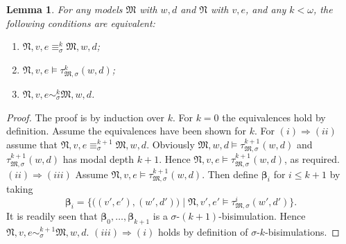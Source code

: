 \documentclass[10pt,a4paper]{amsart}
\theoremstyle{plain}
\newtheorem{lem}[thm]{Lemma}
\theoremstyle{definition}
\newcommand{\bs}{\boldsymbol{\beta}}
\begin{document}
\begin{lem}\label{lem:new3}
	For any models $\mathfrak{M}$ with $w,d$ and $\mathfrak{N}$ with $v,e$, and any $k < \omega$,  the following conditions are equivalent\textup{:} 
	\begin{enumerate}[style=multiline,leftmargin=0.8cm]
		\item[$(i)$] $\mathfrak{N},v,e \equiv_{\sigma}^{k} \mathfrak{M},w,d$\textup{;}
		\item[$(ii)$] $\mathfrak{N},v,e \models \tau_{\mathfrak{M},\sigma}^{k}(w,d)$\textup{;}
		\item[$(iii)$] $\mathfrak{N},v,e \sim_{\sigma}^{k} \mathfrak{M},w,d$.
	\end{enumerate}
\end{lem} 
%
\begin{proof}
	The proof is by induction over $k$. For $k=0$ the equivalences hold by definition. Assume the equivalences have been shown for $k$. For $(i) \Rightarrow (ii)$ assume that $\mathfrak{N},v,e \equiv_{\sigma}^{k+1} \mathfrak{M},w,d$. Obviously $\mathfrak{M},w,d \models \tau_{\mathfrak{M},\sigma}^{k+1}(w,d)$ and $\tau_{\mathfrak{M},\sigma}^{k+1}(w,d)$ has modal depth $k+1$. Hence
	$\mathfrak{N},v,e \models \tau_{\mathfrak{M},\sigma}^{k+1}(w,d)$, as required.
	$(ii) \Rightarrow (iii)$
	Assume $\mathfrak{N},v,e\models \tau_{\mathfrak{M},\sigma}^{k+1}(w,d)$. Then define $\bs_i$ for $i\leq k+1$ by taking
	$$
	\bs_{i} = \bigl\{\bigl((v',e'),(w',d')\bigr) \mid \mathfrak{N},v',e' \models \tau_{\mathfrak{M},\sigma}^{i}(w',d')\bigr\}.
	$$
	It is readily seen that $\bs_{0},\dots,\bs_{k+1}$ is a $\sigma$-$(k+1)$-bisimulation. Hence $\mathfrak{N},v,e \sim_{\sigma}^{k+1} \mathfrak{M},w,d$.
	$(iii) \Rightarrow (i)$ holds by definition
	of $\sigma$-$k$-bisimulations. 
\end{proof}	
\end{document}
